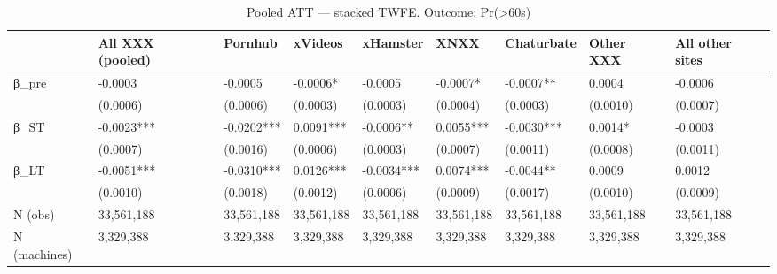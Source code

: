 \begin{table}

\caption{Pooled ATT — stacked TWFE. Outcome: Pr(>60s)}
\centering
\begin{tabular}[t]{lllllllll}
\toprule
  & All XXX (pooled) & Pornhub & xVideos & xHamster & XNXX & Chaturbate & Other XXX & All other sites\\
\midrule
β\_pre & -0.0003 & -0.0005 & -0.0006* & -0.0005 & -0.0007* & -0.0007** & 0.0004 & -0.0006\\
 & (0.0006) & (0.0006) & (0.0003) & (0.0003) & (0.0004) & (0.0003) & (0.0010) & (0.0007)\\
β\_ST & -0.0023*** & -0.0202*** & 0.0091*** & -0.0006** & 0.0055*** & -0.0030*** & 0.0014* & -0.0003\\
 & (0.0007) & (0.0016) & (0.0006) & (0.0003) & (0.0007) & (0.0011) & (0.0008) & (0.0011)\\
β\_LT & -0.0051*** & -0.0310*** & 0.0126*** & -0.0034*** & 0.0074*** & -0.0044** & 0.0009 & 0.0012\\
\addlinespace
 & (0.0010) & (0.0018) & (0.0012) & (0.0006) & (0.0009) & (0.0017) & (0.0010) & (0.0009)\\
N (obs) & 33,561,188 & 33,561,188 & 33,561,188 & 33,561,188 & 33,561,188 & 33,561,188 & 33,561,188 & 33,561,188\\
N (machines) & 3,329,388 & 3,329,388 & 3,329,388 & 3,329,388 & 3,329,388 & 3,329,388 & 3,329,388 & 3,329,388\\
\bottomrule
\end{tabular}
\end{table}
